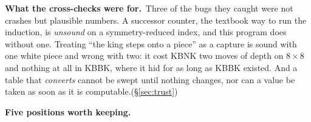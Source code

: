 \documentclass[11pt]{article}
\begin{document}
\smallskip
\noindent\textbf{What the cross-checks were for.}\ Three of the bugs they
caught were not crashes but plausible numbers. A successor counter, the
textbook way to run the induction, is \emph{unsound} on a symmetry-reduced
index, and this program does without one. Treating ``the king steps onto a
piece'' as a capture is sound with one white piece and wrong with two: it cost
KBNK two moves of depth on $8\times8$ and nothing at all in KBBK, where it hid
for as long as KBBK existed. And a table that \emph{converts} cannot be swept
until nothing changes, nor can a value be taken as soon as it is
computable.\hfill(\S\ref{sec:trust})

\normalsize
\vspace{3mm}
\noindent\textbf{Five positions worth keeping.}
\end{document}
